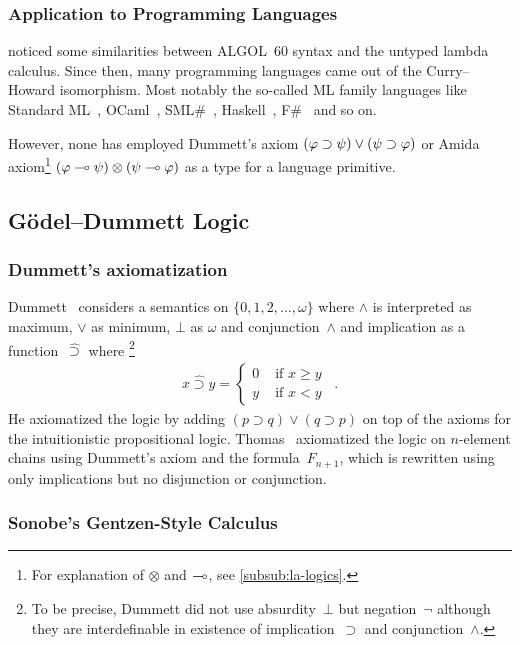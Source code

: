 \subsubsection{Application to Programming Languages}

\citet{landin1965} noticed some similarities between ALGOL~60 syntax and
the untyped lambda calculus.
Since then, many programming languages came out of the Curry--Howard
isomorphism.  Most notably the so-called ML family languages like
Standard ML~\citep{milner1997definition},
OCaml~\citep{minsky2011}, SML\#~\citep{ohori2011},
Haskell~\citep{marlow2010haskell}, F\#~\citep{beginf} and so on.

However, none has employed Dummett's axiom
$(\varphi\supset\psi)\lor(\psi\supset\varphi)$
or Amida axiom\footnote{For explanation of $\otimes$ and $\multimap$, see \ref{subsub:la-logics}.}
$(\varphi\multimap\psi)\otimes(\psi\multimap\varphi)$
as a type for a language primitive.

\subsection{G\"odel--Dummett Logic}
\subsubsection{Dummett's axiomatization}
Dummett~\cite{dummett59} considers a semantics on $\{0,1,2,\ldots,\omega\}$ where
$\wedge$ is interpreted as maximum, $\vee$ as minimum, $\bot$ as $\omega$
and conjunction~$\wedge$
 and implication as a
function~$\hat\supset$ where%
\footnote{To be precise, Dummett did not use absurdity~$\bot$ but negation~$\neg$
although they are interdefinable in existence of implication~$\supset$
and conjunction~$\wedge$.}
\begin{align*}
 x \hat\supset y= \begin{cases}
		    0 &\text{ if } x\ge y \\
		    y &\text{ if } x < y
		  \end{cases}\enspace.
\end{align*}
He axiomatized the logic by adding $(p\supset q)\lor(q\supset p)$ on top
of the axioms for the intuitionistic propositional logic.
Thomas~\citep{thomas1962} axiomatized
 the logic on $n$-element chains using Dummett's axiom and the
 formula~$F_{n+1}$,
 which is rewritten using only implications but no disjunction or conjunction.

\subsubsection{Sonobe's Gentzen-Style Calculus}

